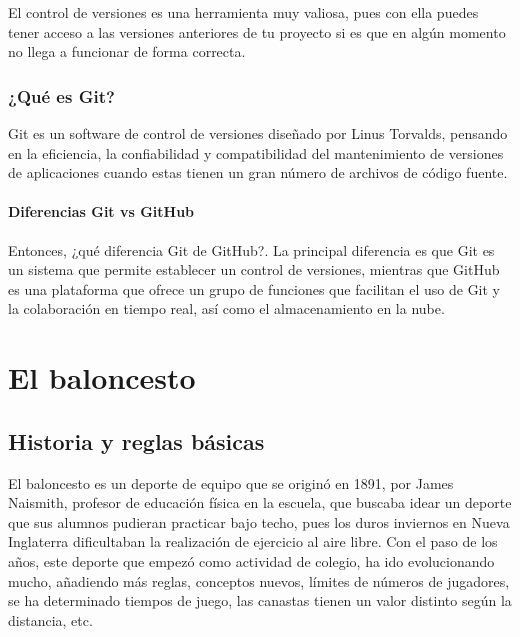 \documentclass[
]{article}
\begin{document}
El control de versiones es una herramienta muy valiosa, pues con ella
puedes tener acceso a las versiones anteriores de tu proyecto si es que
en algún momento no llega a funcionar de forma correcta.

\hypertarget{quuxe9-es-git}{%
\subsubsection{¿Qué es Git?}\label{quuxe9-es-git}}

Git es un software de control de versiones diseñado por Linus Torvalds,
pensando en la eficiencia, la confiabilidad y compatibilidad del
mantenimiento de versiones de aplicaciones cuando estas tienen un gran
número de archivos de código fuente.

\hypertarget{diferencias-git-vs-github}{%
\paragraph{Diferencias Git vs GitHub}\label{diferencias-git-vs-github}}

Entonces, ¿qué diferencia Git de GitHub?. La principal diferencia es que
Git es un sistema que permite establecer un control de versiones,
mientras que GitHub es una plataforma que ofrece un grupo de funciones
que facilitan el uso de Git y la colaboración en tiempo real, así como
el almacenamiento en la nube.

\hypertarget{el-baloncesto}{%
\section{El baloncesto}\label{el-baloncesto}}

\hypertarget{historia-y-reglas-buxe1sicas}{%
\subsection{Historia y reglas
básicas}\label{historia-y-reglas-buxe1sicas}}

El baloncesto es un deporte de equipo que se originó en 1891, por James
Naismith, profesor de educación física en la escuela, que buscaba idear
un deporte que sus alumnos pudieran practicar bajo techo, pues los duros
inviernos en Nueva Inglaterra dificultaban la realización de ejercicio
al aire libre. Con el paso de los años, este deporte que empezó como
actividad de colegio, ha ido evolucionando mucho, añadiendo más reglas,
conceptos nuevos, límites de números de jugadores, se ha determinado
tiempos de juego, las canastas tienen un valor distinto según la
distancia, etc.
\end{document}
